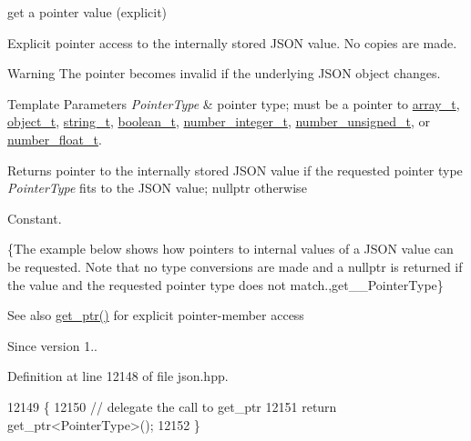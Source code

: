 get a pointer value (explicit) 

Explicit pointer access to the internally stored J\+S\+ON value. No copies are made.

\begin{DoxyWarning}{Warning}
The pointer becomes invalid if the underlying J\+S\+ON object changes.
\end{DoxyWarning}

\begin{DoxyTemplParams}{Template Parameters}
{\em Pointer\+Type} & pointer type; must be a pointer to \hyperlink{classnlohmann_1_1basic__json_ae095578e03df97c5b3991787f1056374}{array\+\_\+t}, \hyperlink{classnlohmann_1_1basic__json_a5e48a7893520e1314bf0c9723e26ea2a}{object\+\_\+t}, \hyperlink{classnlohmann_1_1basic__json_a61f8566a1a85a424c7266fb531dca005}{string\+\_\+t}, \hyperlink{classnlohmann_1_1basic__json_a4c919102a9b4fe0d588af64801436082}{boolean\+\_\+t}, \hyperlink{classnlohmann_1_1basic__json_a98e611d67b7bd75307de99c9358ab2dc}{number\+\_\+integer\+\_\+t}, \hyperlink{classnlohmann_1_1basic__json_ab906e29b5d83ac162e823ada2156b989}{number\+\_\+unsigned\+\_\+t}, or \hyperlink{classnlohmann_1_1basic__json_a88d6103cb3620410b35200ee8e313d97}{number\+\_\+float\+\_\+t}.\\
\hline
\end{DoxyTemplParams}
\begin{DoxyReturn}{Returns}
pointer to the internally stored J\+S\+ON value if the requested pointer type {\itshape Pointer\+Type} fits to the J\+S\+ON value; {\ttfamily nullptr} otherwise
\end{DoxyReturn}
Constant.

\{The example below shows how pointers to internal values of a J\+S\+ON value can be requested. Note that no type conversions are made and a {\ttfamily nullptr} is returned if the value and the requested pointer type does not match.,get\+\_\+\+\_\+\+Pointer\+Type\}

\begin{DoxySeeAlso}{See also}
\hyperlink{classnlohmann_1_1basic__json_aefa46bd2d96bb77a38d1c8b431eab44f}{get\+\_\+ptr()} for explicit pointer-\/member access
\end{DoxySeeAlso}
\begin{DoxySince}{Since}
version 1.. 
\end{DoxySince}


Definition at line 12148 of file json.\+hpp.


\begin{DoxyCode}
12149     \{
12150         \textcolor{comment}{// delegate the call to get\_ptr}
12151         \textcolor{keywordflow}{return} get\_ptr<PointerType>();
12152     \}
\end{DoxyCode}
\mbox{\label{classnlohmann_1_1basic__json_a44a090c15a67b9f02e579b6e17ef0e1b}} 
